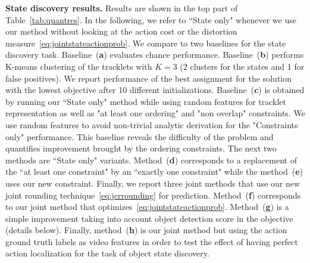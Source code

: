 \noindent\textbf{State discovery results.}
Results are shown in the top part of Table~\ref{tab:quantres}.
In the following, we refer to ``State only" whenever we use our method without looking at the action cost or the distortion measure~\eqref{eq:jointstateactionprob}.
We compare to two baselines for the state discovery task.
Baseline~(\textbf{a}) evaluates chance performance.
Baseline~(\textbf{b}) performs K-means clustering of the tracklets with $K=3$ (2 clusters for the states and 1 for false positives).
We report performance of the best assignment for the solution with the lowest objective after 10 different initializations.
Baseline~(\textbf{c}) is obtained by running our ``State only" method while using random features for tracklet representation as well as "at least one ordering" and "non overlap" constraints. We use random features to avoid non-trivial analytic derivation for the "Constraints only" performance. This baseline reveals the difficulty of the problem and quantifies improvement brought by the ordering constraints.
The next two methods are ``State only" variants.
Method~(\textbf{d}) corresponds to a replacement of the ``at least one constraint" by an ``exactly one constraint" while the method~(\textbf{e}) uses our new constraint.
Finally, we report three joint methods that use our new joint rounding technique~\eqref{eq:jcrrounding} for prediction.
Method~(\textbf{f}) corresponds to our joint method that optimizes~\eqref{eq:jointstateactionprob}.
Method~(\textbf{g}) is a simple improvement taking into account object detection score in the objective (details below). %
Finally, method~(\textbf{h}) is our joint method but using the action ground truth labels as video features in order to test the effect of having perfect action localization for the task of object state discovery. 

